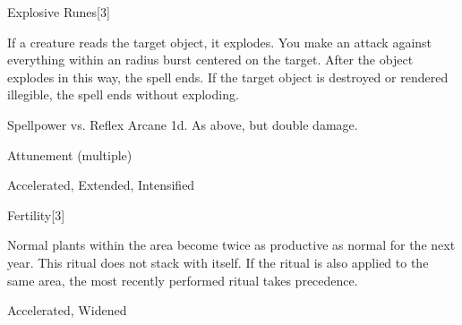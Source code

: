 \begin{spellsection}{Explosive Runes}[3]
\begin{spellcontent}
\begin{spelltargetinginfo}
\end{spelltargetinginfo}
\begin{spelleffects}
\spelleffect
If a creature reads the target object, it explodes.
You make an attack against everything within an \areamed radius burst centered on the target.
After the object explodes in this way, the spell ends.
If the target object is destroyed or rendered illegible, the spell ends without exploding.
\begin{spellattack}{Spellpower vs. Reflex}
\spellsuccess Arcane  \minus1d.
\spellcritical As above, but double damage.
\end{spellattack}
\spelldur Attunement (multiple)
\end{spelleffects}
\end{spellcontent}
\begin{spellfooter}
 Accelerated, Extended, Intensified
\end{spellfooter}
\begin{spellsubcontent}
\end{spellsubcontent}
\end{spellsection}
\begin{spellsection}{Fertility}[3]
\begin{spellcontent}
\begin{spelltargetinginfo}
\end{spelltargetinginfo}
\begin{spelleffects}
\spelleffect
Normal plants within the area become twice as productive as normal for the next year.
This ritual does not stack with itself.
If the  ritual is also applied to the same area, the most recently performed ritual takes precedence.
\end{spelleffects}
\end{spellcontent}
\begin{spellfooter}
 Accelerated, Widened
\end{spellfooter}
\begin{spellsubcontent}
\end{spellsubcontent}
\end{spellsection}
